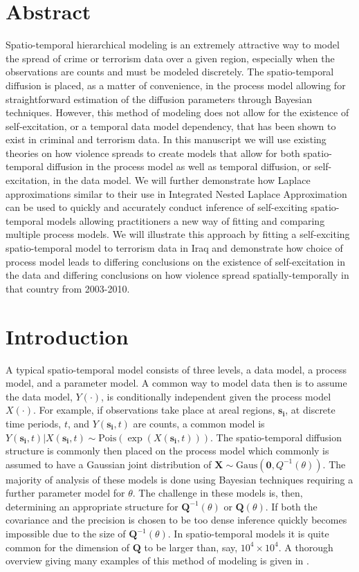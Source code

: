 \documentclass[11pt]{isuthesis}
\begin{document}
\section*{Abstract}
Spatio-temporal hierarchical modeling is an extremely attractive way to model the spread of crime or terrorism data over a given region, especially when the observations are counts and must be modeled discretely.  The spatio-temporal diffusion is placed, as a matter of convenience, in the process model allowing for straightforward estimation of the diffusion parameters through Bayesian techniques.  However, this method of modeling does not allow for the existence of self-excitation, or a temporal data model dependency, that has been shown to exist in criminal and terrorism data.  In this manuscript we will use existing theories on how violence spreads to create models that allow for both spatio-temporal diffusion in the process model as well as temporal diffusion, or self-excitation, in the data model.  We will further demonstrate how Laplace approximations similar to their use in Integrated Nested Laplace Approximation can be used to quickly and accurately conduct inference of self-exciting spatio-temporal models allowing practitioners a new way of fitting and comparing multiple process models.  We will illustrate this approach by fitting a self-exciting spatio-temporal model to terrorism data in Iraq and demonstrate how choice of process model leads to differing conclusions on the existence of self-excitation in the data and differing conclusions on how violence spread spatially-temporally in that country from 2003-2010.

\section{Introduction} 
A typical spatio-temporal model consists of three levels, a data model, a process model, and a parameter model.  A common way to model data then is to assume the data model, $Y(\cdot)$, is conditionally independent given the process model $X(\cdot)$. For example, if observations take place at areal regions, $\boldsymbol{s_i}$, at discrete time periods, $t$, and $Y(\boldsymbol{s_i},t)$ are counts, a common model is $Y(\boldsymbol{s_i},t)|X(\boldsymbol{s_i},t)\sim \mbox{Pois}(\exp(X(\boldsymbol{s_i},t)))$.  The spatio-temporal diffusion structure is commonly then placed on the process model which commonly is assumed to have a Gaussian joint distribution of $\boldsymbol{X}\sim \mbox{Gaus}(\boldsymbol{0},Q^{-1}(\theta))$.  The majority of analysis of these models is done using Bayesian techniques requiring a further parameter model for $\theta$.  The challenge in these models is, then, determining an appropriate structure for $\boldsymbol{Q}^{-1}(\theta)$ or $\boldsymbol{Q}(\theta)$.  If both the covariance and the precision is chosen to be too dense inference quickly becomes impossible due to the size of $\boldsymbol{Q}^{-1}(\theta)$.  In spatio-temporal models it is quite common for the dimension of $\boldsymbol{Q}$ to be larger than, say, $10^4\times 10^4$.  A thorough overview giving many examples of this method of modeling is given in \cite{cressie2015statistics}.
\end{document}
